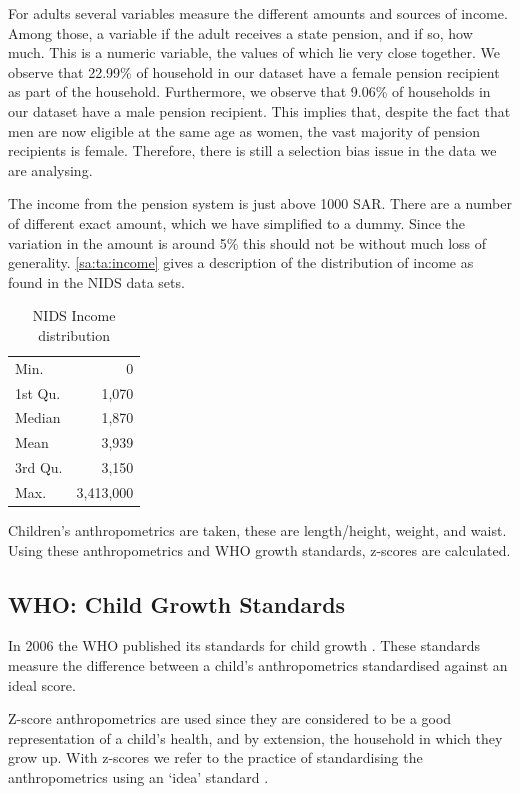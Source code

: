 \begin{refsection}
For adults several variables measure the different amounts and sources of income.
Among those, a variable if the adult receives a state pension, and if so, how much.
This is a numeric variable, the values of which lie very close together.
We observe that 22.99\% of household in our dataset have a female pension recipient as part of the household.
Furthermore, we observe that 9.06\% of households in our dataset have a male pension recipient.
This implies that, despite the fact that men are now eligible at the same age as women,
the vast majority of pension recipients is female.
Therefore, there is still a selection bias issue in the data we are analysing.

The income from the pension system is just above 1000 SAR.
There are a number of different exact amount, which we have simplified to a dummy.
Since the variation in the amount is around 5\% this should not be without much loss of generality.
\autoref{sa:ta:income} gives a description of the distribution of income as found in the NIDS data sets.

\begin{table}[hb!]
\centering
\caption{NIDS Income distribution}
\label{sa:ta:income}
\begin{tabular}{l|r}
\hline
  Min. & 0 \\
  1st Qu. & 1,070 \\
  Median & 1,870 \\
  Mean & 3,939 \\
  3rd Qu. & 3,150 \\
  Max. & 3,413,000 \\
\end{tabular}
\end{table}

Children's anthropometrics are taken, these are length/height, weight, and waist.
Using these anthropometrics and WHO growth standards, z-scores are calculated.


\subsection{WHO: Child Growth Standards}
\label{sa:data:who}
In 2006 the WHO published its standards for child growth \parencite{who2006child}.
These standards measure the difference between a child's anthropometrics
standardised against an ideal score.

Z-score anthropometrics are used since they are considered to be a good representation of a child's health,
and by extension, the household in which they grow up.
With z-scores we refer to the practice of standardising the anthropometrics using an `idea' standard \parencite{who2006child}.


\end{refsection}
